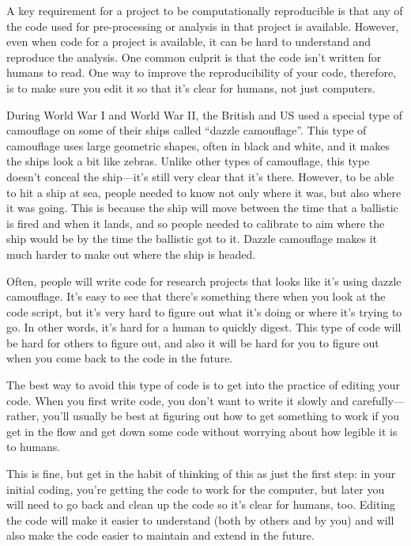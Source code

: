 \documentclass[]{tufte-book}
\begin{document}
A key requirement for a project to be computationally reproducible is that any
of the code used for pre-processing or analysis in that project is available.
However, even when code for a project is available, it can be hard to understand
and reproduce the analysis. One common culprit is that the code isn't written
for humans to read. One way to improve the reproducibility of your code,
therefore, is to make sure you edit it so that it's clear for humans, not just
computers.

During World War I and World War II, the British and US used a special type of
camouflage on some of their ships called ``dazzle camouflage''. This type of
camouflage uses large geometric shapes, often in black and white, and it makes
the ships look a bit like zebras. Unlike other types of camouflage, this type
doesn't conceal the ship---it's still very clear that it's there. However, to be
able to hit a ship at sea, people needed to know not only where it was, but also
where it was going. This is because the ship will move between the time that a
ballistic is fired and when it lands, and so people needed to calibrate to aim
where the ship would be by the time the ballistic got to it. Dazzle camouflage
makes it much harder to make out where the ship is headed.

Often, people will write code for research projects that looks like it's using
dazzle camouflage. It's easy to see that there's something there when you look
at the code script, but it's very hard to figure out what it's doing or where
it's trying to go. In other words, it's hard for a human to quickly digest. This
type of code will be hard for others to figure out, and also it will be hard for
you to figure out when you come back to the code in the future.

The best way to avoid this type of code is to get into the practice of editing
your code. When you first write code, you don't want to write it slowly and
carefully---rather, you'll usually be best at figuring out how to get something
to work if you get in the flow and get down some code without worrying about how
legible it is to humans.

This is fine, but get in the habit of thinking of this as just the first step:
in your initial coding, you're getting the code to work for the computer, but
later you will need to go back and clean up the code so it's clear for humans,
too. Editing the code will make it easier to understand (both by others and by
you) and will also make the code easier to maintain and extend in the future.
\end{document}
